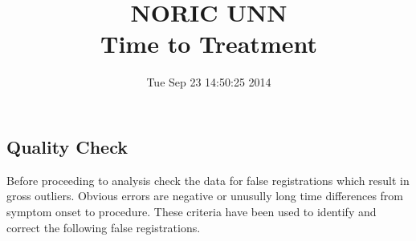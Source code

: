 \documentclass[presentation,xcolor=pdftex,dvipsnames,table,11pt]{beamer}
\title{NORIC UNN \\Time to Treatment}\date{ Tue Sep 23 14:50:25 2014 }
\begin{document}
\begin{tiny}

\maketitle
\tableofcontents











\section{Quality Check}

\begin{frame}
  
Before proceeding to analysis check the data for false registrations which result in gross outliers. Obvious errors are negative or unusully long time differences from symptom onset to procedure. These criteria have been used to identify and correct the following false registrations.


\end{frame}
\end{tiny}
\end{document}
